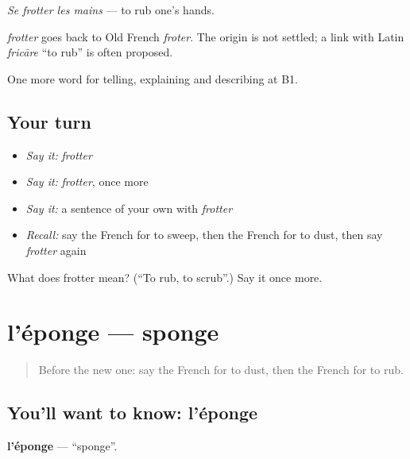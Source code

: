 \emph{Se frotter les mains} — to rub one's hands.

\begin{cousinweb}
\emph{frotter} goes back to Old French \emph{froter}. The origin is not settled; a link with Latin \emph{fricāre} \textquotedblleft{}to rub\textquotedblright{} is often proposed.
\end{cousinweb}

\begin{grammarlens}[title={What you've built}]
One more word for telling, explaining and describing at B1.
\end{grammarlens}

\subsection*{Your turn}
\begin{itemize}
\raggedright
  \item \emph{Say it:} \emph{frotter}
  \item \emph{Say it:} \emph{frotter}, once more
  \item \emph{Say it:} a sentence of your own with \emph{frotter}
  \item \emph{Recall:} say the French for to sweep, then the French for to dust, then say \emph{frotter} again
\end{itemize}

\begin{tcolorbox}[breakable,colback=teal!4,colframe=teal!35!black,title={Before you move on}]
What does frotter mean? (\textquotedblleft{}To rub, to scrub\textquotedblright{}.) Say it once more.
\end{tcolorbox}
\section[l'éponge]{l'éponge — sponge}

\label{lesson:FR-C528-eponge}



\begin{quote}
Before the new one: say the French for to dust, then the French for to rub.
\end{quote}

\subsection*{You'll want to know: l'éponge}
\textbf{l'éponge} — \textquotedblleft{}sponge\textquotedblright{}.

